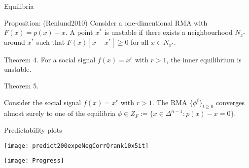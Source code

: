 \begin{frame}[c]{Equilibria}
\begin{block}{Proposition: (Renlund2010)}
Consider a one-dimentional RMA with $F(x)=p(x)-x$. A point $x^*$ is unstable if there exists a neighbourhood $N_{x^*}$ around $x^*$ such that $F(x)[x-x^*]\geq 0$ for all $x\in N_{x^*}$.
\end{block}

\begin{exampleblock}{Theorem 4.}
\label{unstable}
For a social signal $f(x)=x^r$ with $r>1$, the inner equilibrium is unstable.
\end{exampleblock}


\begin{exampleblock}{Theorem 5.}

Consider the social signal $f(x)=x^r$ with $r>1$. The RMA $\{\phi^t\}_{t \geq 0}$ converges almost surely to one of the equilibria $\phi\in Z_F:=\{x\in \Delta^{n-1}: p(x)-x=0\}$.
\end{exampleblock}
\end{frame}





\begin{frame}[c]{Predictability plots}
\begin{center}
\texttt{[image: predict200expeNegCorrQrank10x5it]}
\end{center}


\end{frame}


\addtocounter{framenumber}{-1}
{	
\begin{frame}[c]
\begin{center}

	\vspace{10em}
	 \texttt{[image: Progress]}\\
	\vspace{.5em}
	
\end{center}
\end{frame}
}





